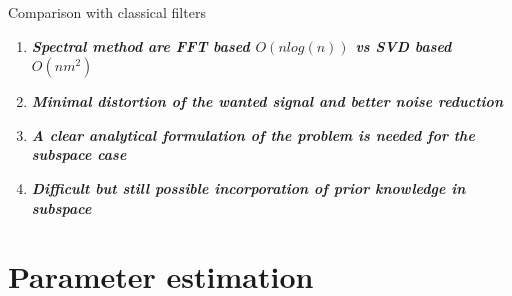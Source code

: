 \documentclass[t,12pt,english
\ifx\beamermode\undefined\else,\beamermode\fi
]{beamer}
\begin{document}
\begin{frame}{Comparison with classical filters}

\begin{block}{\footnotesize{}}\tiny{}
\begin{enumerate} 
\vspace{0.05cm}
     \item \tiny{\textbf{\textit{Spectral method are FFT based $O(nlog(n))$ vs SVD based $O(nm^2)$}}}
     \item \tiny{\textbf{\textit{Minimal distortion of the wanted signal and better noise reduction}}}
     \item \tiny{\textbf{\textit{A clear analytical formulation of the problem is needed for the subspace case}}} 
     \item \tiny{\textbf{\textit{Difficult but still possible incorporation of prior knowledge in subspace}}} 

     
\end{enumerate}
\end{block}
  
\end{frame}

\section{Parameter estimation}\label{second-section}
\end{document}
